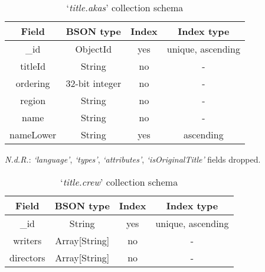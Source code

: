 \begin{table}[H]
	\caption{`\textit{title.akas}' collection schema}
\begin{center}
	\begin{tabular}{ cccc }
		\hline
		Field & BSON type & Index & Index type \\
		\hline
		\_id & ObjectId & yes & unique, ascending \\
		titleId & String & no & - \\
		ordering & 32-bit integer & no & - \\
		region & String & no & - \\
		name & String & no & - \\
		nameLower & String & yes & ascending \\
		\hline
	\end{tabular}
\end{center}
\end{table}

\textit{N.d.R.}: \textit{`language'}, \textit{`types'}, \textit{`attributes'}, \textit{`isOriginalTitle'} fields dropped.

\begin{table}[H]
	\caption{`\textit{title.crew}' collection schema}
\begin{center}
	\begin{tabular}{ cccc }
		\hline
		Field & BSON type & Index & Index type \\
		\hline
		\_id & String & yes & unique, ascending \\
		writers & Array[String] & no & - \\
		directors & Array[String] & no & - \\
		\hline
	\end{tabular}
\end{center}
\end{table}

